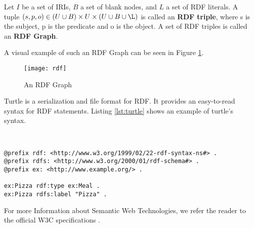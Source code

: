 \begin{definition}
    Let $I$ be a set of IRIs, $B$ a set of blank nodes, and $L$ a set of RDF literals. A tuple $\displaystyle (s,p,o) \in (U \cup B) \times U \times (U \cup B \cup \L)$ is called an \textbf{RDF triple}, where s is the subject, p is the predicate and o is the object. A set of RDF triples is called an \textbf{RDF Graph}.
\end{definition}

A visual example of such an RDF Graph can be seen in Figure \ref{fig:rdfgraph}.

\begin{figure}[H]
    \centering
    \texttt{[image: rdf]}
    \caption[]{An RDF Graph}
    \label{fig:rdfgraph}
\end{figure}

Turtle is a serialization and file format for RDF. It provides an easy-to-read syntax for RDF statements. Listing \ref{lst:turtle} shows an example of turtle's syntax.

\

\begin{lstlisting}[caption={turtle example}, label=lst:turtle]
@prefix rdf: <http://www.w3.org/1999/02/22-rdf-syntax-ns#> .
@prefix rdfs: <http://www.w3.org/2000/01/rdf-schema#> .
@prefix ex: <http://www.example.org/> .

ex:Pizza rdf:type ex:Meal .
ex:Pizza rdfs:label "Pizza" .

\end{lstlisting}

For more Information about Semantic Web Technologies, we refer the reader to the official W3C specifications \cite{rdf, rdfs, owl, turtle, sparql, xsd}.